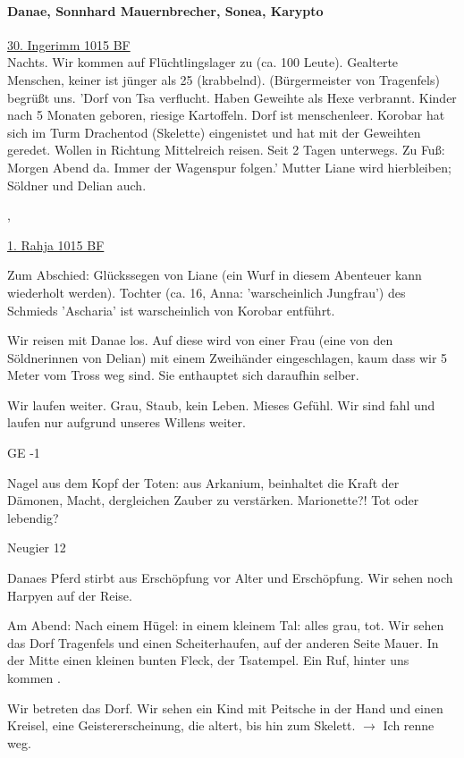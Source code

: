 
\paragraph{Danae, Sonnhard Mauernbrecher, Sonea, Karypto}
\underline{30. Ingerimm 1015 BF}\\
Nachts. Wir kommen auf Flüchtlingslager zu (ca. 100 Leute). Gealterte Menschen, keiner ist jünger als 25 (krabbelnd).
 (Bürgermeister von Tragenfels) begrüßt uns. 'Dorf von Tsa verflucht. Haben Geweihte als Hexe verbrannt. Kinder nach 5 Monaten geboren, riesige Kartoffeln. Dorf ist menschenleer. Korobar hat sich im Turm Drachentod (Skelette) eingenistet und hat mit der Geweihten geredet. Wollen in Richtung Mittelreich reisen. Seit 2 Tagen unterwegs. Zu Fuß: Morgen Abend da. Immer der Wagenspur folgen.' Mutter Liane wird hierbleiben; Söldner und Delian auch.

,


\underline{1. Rahja 1015 BF}

Zum Abschied: Glückssegen von Liane (ein Wurf in diesem Abenteuer kann wiederholt werden). 
Tochter (ca. 16, Anna: 'warscheinlich Jungfrau') des Schmieds 'Ascharia' ist warscheinlich von Korobar entführt.

Wir reisen mit Danae los. Auf diese wird von einer Frau (eine von den Söldnerinnen von Delian) mit einem Zweihänder eingeschlagen, kaum dass wir 5 Meter vom Tross weg sind. Sie enthauptet sich daraufhin selber. 

Wir laufen weiter. Grau, Staub, kein Leben. Mieses Gefühl. Wir sind fahl und laufen nur aufgrund unseres Willens weiter.

{\color{red} GE -1}

Nagel aus dem Kopf der Toten: aus Arkanium, beinhaltet die Kraft der Dämonen, Macht, dergleichen Zauber zu verstärken. Marionette?! Tot oder lebendig? 

{\color{red} Neugier 12}

Danaes Pferd stirbt aus Erschöpfung vor Alter und Erschöpfung. Wir sehen noch Harpyen auf der Reise. 

Am Abend: Nach einem Hügel: in einem kleinem Tal: alles grau, tot. Wir sehen das Dorf Tragenfels und einen Scheiterhaufen, auf der anderen Seite Mauer. In der Mitte einen kleinen bunten Fleck, der Tsatempel. 
Ein Ruf, hinter uns kommen .

Wir betreten das Dorf. Wir sehen ein Kind mit Peitsche in der Hand und einen Kreisel, eine Geistererscheinung, die altert, bis hin zum Skelett. $\rightarrow$ Ich renne weg.

